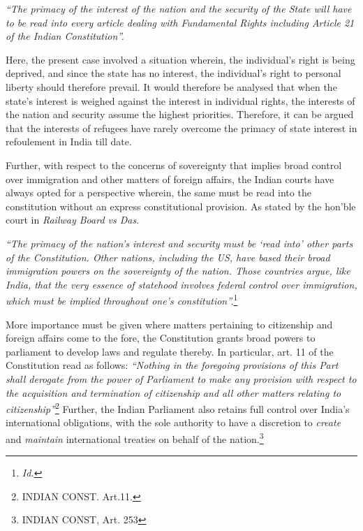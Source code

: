 \begin{multicols}{2}

\noi
\textit{“The primacy of the interest of the nation and the security of the State will have to be read
into every article dealing with Fundamental Rights including Article 21 of the Indian
Constitution”.}


\noi
Here, the present case involved a situation wherein, the individual's right is being deprived,
and since the state has no interest, the individual's right to personal liberty should therefore
prevail. It would therefore be analysed that when the state's interest is weighed against the
interest in individual rights, the interests of the nation and security assume the highest
priorities. Therefore, it can be argued that the interests of refugees have rarely overcome the
primacy of state interest in refoulement in India till date.

\vspace{-.15cm}

\noi
Further, with respect to the concerns of sovereignty that implies broad control over
immigration and other matters of foreign affairs, the Indian courts have always opted for a
perspective wherein, the same must be read into the constitution without an express
constitutional provision. As stated by the hon’ble court in \textit{Railway Board vs Das}.

\vspace{-.15cm}
\noi
\textit{“The primacy of the nation's interest and security must be ‘read into’ other parts of the
Constitution. Other nations, including the US, have based their broad immigration powers on
the sovereignty of the nation. Those countries argue, like India, that the very essence of statehood involves federal control over immigration, which must be implied throughout one's
constitution”.}\footnote{\textit{Id.}}

\vspace{-.15cm}

\noi
More importance must be given where matters pertaining to citizenship and foreign affairs
come to the fore, the Constitution grants broad powers to parliament to develop laws and
regulate thereby. In particular, art. 11 of the Constitution read as follows: \textit{“Nothing in the
foregoing provisions of this Part shall derogate from the power of Parliament to make any
provision with respect to the acquisition and termination of citizenship and all other matters
relating to citizenship”}\footnote{INDIAN CONST. Art.11.} Further, the Indian Parliament also retains full control over India's
international obligations, with the sole authority to have a discretion to \textit{create} and \textit{maintain}
international treaties on behalf of the nation.\footnote{INDIAN CONST, Art. 253}


\end{multicols}
